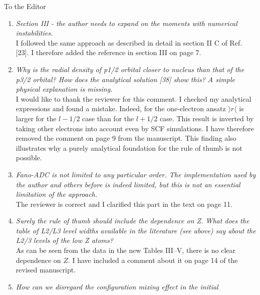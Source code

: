 \documentclass[DIN,pagenumber=false,parskip=half,fromalign=left,fromphone=false,fromemail=true,fromurl=false,fromlogo=false,fromrule=false]{scrlttr2}
\begin{document}
\begin{letter}{To the Editor}
\begin{enumerate}
       I would like to thank the reviewer for pointing this out.
       To give an overview of all ADC references, I have added the book by J. Schirmer
       as well as the standard 1983 reference and clarified the sentence.
       The original FanoADC reference was initially not given, as the context
       in the manuscript are relativistic approaches.
       But I do agree that it deserves the credit and
       have added the reference
       on page 3.
 \item \emph{Section III - the author needs to expand on the moments with numerical
       instabilities.}\\
       I followed the same approach as described in detail in section II C of Ref. [23].
       I therefore added the reference in section III on page 7.
 \item \emph{Why is the radial density of p1/2 orbital closer to nucleus than that of
       the p3/2 orbital? How does the analytical solution [38] show this? A simple
       physical explanation is missing.}\\
       I would like to thank the reviewer for this comment.
       I checked my analytical expressions and found a mistake. Indeed, for the
       one-electron ansatz $\rangle r \langle$ is larger for the $l-1/2$ case than for the $l+1/2$
       case. This result is inverted by taking other electrons into account even by
       SCF simulations.
       I have therefore removed the comment on page 9 from the manuscript.
       This finding also illustrates
       why a purely analytical foundation for the rule of thumb is not possible.
 \item \emph{Fano-ADC is not limited to any particular order. The implementation
       used by the author and others before is indeed limited, but this is not an
       essential limitation of the approach.}\\
       The reviewer is correct and I clarified this part in the text on page 11.
 \item \emph{Surely the rule of thumb should include the dependence on Z. What does
       the table of L2/L3 level widths available in the literature (see above) say
       about the L2/3 levels of the low Z atoms?}\\
       As can be seen from the data in the new Tables III--V, there is no clear
       dependence on $Z$. I have included a comment about it on page 14 of the
       revised manuscript.
 \item \emph{How can we disregard the configuration mixing effect in the initial
}
\end{enumerate}
\end{letter}
\end{document}
